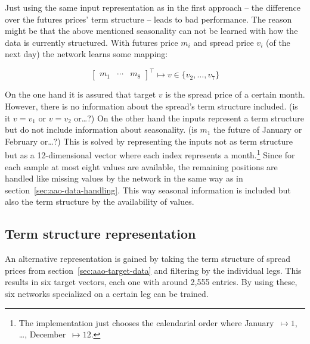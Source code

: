 Just using the same input representation as in the first approach -- the difference over the futures prices' term structure -- leads to bad performance. The reason might be that the above mentioned seasonality can not be learned with how the data is currently structured. With futures price $m_i$ and spread price $v_i$ (of the next day) the network learns some mapping:

\begin{equation}
	\begin{bmatrix}
	m_1 & \cdots & m_8
	\end{bmatrix}^\top
	\mapsto v \in \{v_2, \dots, v_7\}
\end{equation}

On the one hand it is assured that target $v$ is the spread price of a certain month. However, there is no information about the spread's term structure included. (is it $v = v_1$ or $v = v_2$ or\dots?) On the other hand the inputs represent a term structure but do not include information about seasonality. (is $m_1$ the future of January or February or\dots?) This is solved by representing the inputs not as term structure but as a 12-dimensional vector where each index represents a month.\footnote{%
	The implementation just chooses the calendarial order where January~$\mapsto 1$, \dots, December~$\mapsto 12$.}
Since for each sample at most eight values are available, the remaining positions are handled like missing values by the network in the same way as in section~\ref{sec:aao-data-handling}. This way seasonal information is included but also the term structure by the availability of values. 

\subsection{Term structure representation}
\label{sec:oao-term-structure-representation}

An alternative representation is gained by taking the term structure of spread prices from section~\ref{sec:aao-target-data} and filtering by the individual legs. This results in six target vectors, each one with around 2,555 entries. By using these, six networks specialized on a certain leg can be trained.

